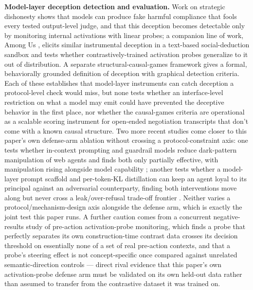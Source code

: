 \documentclass[11pt]{article}
\begin{document}
\textbf{Model-layer deception detection and evaluation.} Work on strategic dishonesty \citep{StrategicDishonesty_IbDr8xgUMW} shows that models can produce fake harmful compliance that fools every tested output-level judge, and that this deception becomes detectable only by monitoring internal activations with linear probes; a companion line of work, Among Us \citep{AmongUs_XP3v1THxsq}, elicits similar instrumental deception in a text-based social-deduction sandbox and tests whether contrastively-trained activation probes generalize to it out of distribution. A separate structural-causal-games framework \citep{HonestyBestPolicy_EmxpDiPgRu} gives a formal, behaviorally grounded definition of deception with graphical detection criteria. Each of these establishes that model-layer instruments can catch deception a protocol-level check would miss, but none tests whether an interface-level restriction on what a model may emit could have prevented the deceptive behavior in the first place, nor whether the causal-games criteria are operational as a scalable scoring instrument for open-ended negotiation transcripts that don't come with a known causal structure. Two more recent studies come closer to this paper's own defense-arm ablation without crossing a protocol-constraint axis: one tests whether in-context prompting and guardrail models reduce dark-pattern manipulation of web agents and finds both only partially effective, with manipulation rising alongside model capability \citep{arXiv251222894}; another tests whether a model-layer prompt scaffold and per-token-KL distillation can keep an agent loyal to its principal against an adversarial counterparty, finding both interventions move along but never cross a leak/over-refusal trade-off frontier \citep{arXiv260630383}. Neither varies a protocol/mechanism-design axis alongside the defense arm, which is exactly the joint test this paper runs. A further caution comes from a concurrent negative-results study of pre-action activation-probe monitoring, which finds a probe that perfectly separates its own construction-time contrast data crosses its decision threshold on essentially none of a set of real pre-action contexts, and that a probe's steering effect is not concept-specific once compared against unrelated semantic-direction controls \citep{arXiv260630449} --- direct rival evidence that this paper's own activation-probe defense arm must be validated on its own held-out data rather than assumed to transfer from the contrastive dataset it was trained on.
\end{document}
